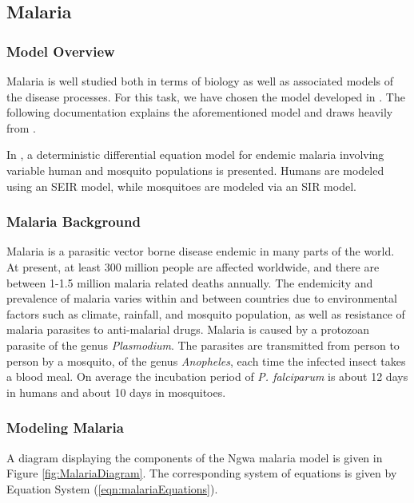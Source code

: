 \documentclass[letter,12pt, usenames,dvipsnames]{article}
\newcommand{\MYhref}[3][Blue]{\href{#2}{\color{#1}{#3}}}
\begin{document}
\pagebreak
\subsection{Malaria} 
\label{sec:Malaria}
\subsubsection{Model Overview}
Malaria is well studied both in terms of biology as well as associated models of the disease processes.  For this task, we have chosen the model developed in {\MYhref{http://streaming.ictp.it/preprints/P/99/158.pdf}{Ngwa and Shu}} \cite{malaria}.  The following documentation explains the aforementioned model and draws heavily from \cite{malaria}.


In \cite{malaria}, a deterministic differential equation model for endemic malaria involving variable human and mosquito populations is presented. Humans are modeled using an SEIR model, while mosquitoes are modeled via an SIR model.




\subsubsection{Malaria Background}
 Malaria is a parasitic vector borne disease endemic in many parts of the world.  At present, at least 300 million people are affected worldwide, and there are between 1-1.5 million malaria related deaths annually. The endemicity and prevalence of malaria varies within and between countries due to environmental factors such as climate, rainfall, and mosquito population, as well as resistance of malaria parasites to anti-malarial drugs. Malaria is caused by a protozoan parasite of the genus \textit{Plasmodium}. The parasites are transmitted from person to person by a mosquito, of the genus \textit{Anopheles}, each time the infected insect takes a blood meal. On average the incubation period of \textit{P. falciparum} is about 12 days in humans and about 10 days in mosquitoes. 

\pagebreak 

\subsubsection{Modeling Malaria}

A diagram displaying the components of the Ngwa malaria model is given in Figure \ref{fig:MalariaDiagram}.  The corresponding system of equations is given by Equation System (\ref{eqn:malariaEquations}).  
\end{document}
